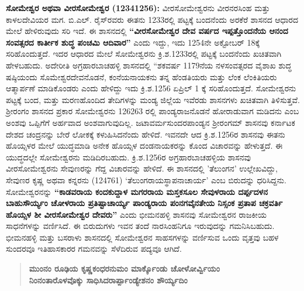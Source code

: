 \textbf{ಸೋಮೇಶ್ವರ ಅಥವಾ ವೀರಸೋಮೇಶ್ವರ (1234\general{\enginline{-}}1256):} ವೀರಸೋಮೇಶ್ವರನು ವೀರನರಸಿಂಹ ಮತ್ತು ಕಾಳಲದೇವಿಯರ ಮಗ. ಬಿ.ಎಲ್​. ರೈಸ್​ರವರು ಈತನು 1233ರಲ್ಲಿ ಪಟ್ಟಕ್ಕೆ ಬಂದನೆಂದು ಅರಕೆರೆ ಶಾಸನದ ಆಧಾರದ ಮೇಲೆ ಹೇಳಿರುವುದು ಸರಿ ಇದೆ. ಈ ಶಾಸನದಲ್ಲಿ \textbf{“ವೀರಸೋಮೇಶ್ವರ ದೇವ ವರ್ಷದ ಇಪ್ಪತ್ತೊಂದನೆಯ ಆನಂದ ಸಂವತ್ಸರದ ಕಾರ್ತೀಕ ಶುದ್ಧ ಪಂಚಮಿ ಆದಿವಾರ”} ಎಂದು ಇದ್ದು, ಇದು 1254ನೇ ಅಕ್ಟೋಬರ್​ 18ಕ್ಕೆ ಸರಿಹೊಂದುತ್ತದೆ. ಇದರ ಆಧಾರದ ಮೇಲೆ ಸೋಮೇಶ್ವರನು ಕ್ರಿ.ಶ.1233ರಲ್ಲಿ ಪಟ್ಟಕ್ಕೆ ಬಂದನೆಂದು ಖಚಿತವಾಗಿ ಹೇಳಬಹುದು. ಅದೇರೀತಿ ಅಗ್ರಹಾರಬಾಚಹಳ್ಳಿ ಶಾಸನದಲ್ಲಿ “ಶಕವರ್ಷ 1179ನೆಯ ನಳಸಂವತ್ಸರದ ವೈಶಾಖ ಶುದ್ಧ ಷಷ್ಠಿಯಂದು ಸೊಮೇಶ್ವರದೇವನೊಡನೆ, ಕಂನೆಯ\-ನಾಯಕನು ತನ್ನ ಹೆಂಡತಿಯರು ಮತ್ತು ಲೆಂಕ ಲೆಂಕಿತಿಯರು ಆತ್ಮಾರ್ಪಣೆ ಮಾಡಿಕೊಂಡರು ಎಂದು ಹೇಳಿದ್ದು ಇದು ಕ್ರಿ.ಶ.1256 ಏಪ್ರಿಲ್​ 1 ಕ್ಕೆ ಸರಿಹೊಂದುತ್ತದೆ. ಸೋಮೇಶ್ವರನು ಪಟ್ಟಕ್ಕೆ ಬಂದ, ಮತ್ತು ಮರಣಹೊಂದಿದ ತೇದಿಗಳನ್ನು ಮಂಡ್ಯ ಜಿಲ್ಲೆಯ ಇವೆರಡು ಶಾಸನಗಳು ಖಚಿತವಾಗಿ ತಿಳಿಸುತ್ತವೆ. ಶ‍್ರೀರಂಗಂ ಶಾಸನದ ಪ್ರಕಾರ ಸೋಮೇಶ್ವರನು 1262\enginline{-}63 ರಲ್ಲಿ ಪಾಂಡ್ಯರಾಜನೊಡನೆ ಹೋರಾಡುವಾಗ ಮಡಿದನು ಎಂಬ ಅಂಶವು ಒಪ್ಪಿಗೆಗೆ ಅರ್ಹವಾದ ಅಂಶವಾಗುವುದಿಲ್ಲ. ಜಟಾವರ್ಮಸುಂದರಪಾಂಡ್ಯನ ಶ‍್ರೀರಂಗಮ್ ಶಾಸನವು ಕರ್ನಾಟಕ ದೇಶದ ಚಂದ್ರನನ್ನು ಬೇರೆ ಲೋಕಕ್ಕೆ ಕಳುಹಿಸಿದನೆಂದು ಹೇಳಿದೆ. ಇವನದೇ ಆದ ಕ್ರಿ.ಶ.1256ರ ಶಾಸನವು ಈತನು ಹೊಯ್ಸಳರ ಮೇಲೆ ಯುದ್ಧಮಾಡಿ ಅನೇಕ ಹೊಯ್ಸಳ ದಂಡನಾಯಕರನ್ನು ಕೊಂದ ವಿಚಾರವನ್ನು ಹೇಳುತ್ತದೆ. ಈ ಯುದ್ಧದಲ್ಲೇ ಸೋಮೇಶ್ವರನು ಮಡಿದಿರಬಹುದು. ಕ್ರಿ.ಶ.1256ರ ಅಗ್ರಹಾರಬಾಚಹಳ್ಳಿಯ ಶಾಸನವು ವೀರಸೋಮೇಶ್ವರನು ಸೇವುಣರನ್ನು ಗೆದ್ದ ವಿಚಾರವನ್ನು ಹೇಳಿದೆ. ಈ ಶಾಸನದಲ್ಲಿ 'ತೆಲುಂಗನ' ಉಲ್ಲೇಖವಿದ್ದು, ಸೇವುಣರ ಕೃಷ್ಣ ಅಥವಾ ಕನ್ನರನು (1247\enginline{-}61) `ತೆಲುಂಗರಾಯಸ್ಥಾಪನಾಚಾರ್ಯ' ಎಂಬ ಬಿರುದನ್ನು ಧರಿಸಿದ್ದನು. ಸೋಮೇಶ್ವರನನ್ನು \textbf{“ಕಾಡವರಾಯ ಕಂದಕುದ್ದಾಳ ಮಗರರಾಯ ಮಸ್ತಕಸೂಲ ಸೇವುಳರಾಯ ದರ್ಪ್ಪದಳನ ಬಾಹುಸೌರ್ಯ್ಯಂ ಚೋಳರಾಯ ಪ್ರತಿಷ್ಟಾಚಾರ್ಯ್ಯ ಪಾಂಡ್ಯರಾಯ ಪಂನಗವೈನತೇಯ ನಿಸ್ಸಂಕ ಪ್ರತಾಪ ಚಕ್ರವರ್ತಿ ಹೊಯ್ಸಳ ಶೀ ವೀರಸೋಮೇಶ್ವರ ದೇವರು”} ಎಂದು ಭೀಮನಹಳ್ಳಿ ಶಾಸನವು ಸೋಮೇಶ್ವರನ ರಾಜಕೀಯ ಸಾಧನೆಗಳನ್ನು ವರ್ಣಿಸಿದೆ. ಈ ಬಿರುದುಗಳು ಇವನ ತಂದೆ ನಾರಸಿಂಹನಿಗೂ ಇರುವುದನ್ನು ಗಮನಿಸಿಬಹುದು. ಭೀಮನಹಳ್ಳಿ ಮತ್ತು ಬಸರಾಳು ಶಾಸನದಲ್ಲಿ ಸೋಮೇಶ್ವರನ ಸಾಹಸಗಳನ್ನು ವರ್ಣಿಸುವ ಒಂದು ವೃತ್ತವು ಬಹಳ ಸುಂದರವೂ ಇತಿಹಾಸಕಾರರ ಗಮನವನ್ನು ಸೆಳೆದಿರುವ ಪದ್ಯವೂ ಆಗಿದೆ.

\begin{verse}
\textbf{ಮುಂನಂ ರೂಢಿಯ ಕೃಷ್ಣಕಂಧರನುಮಂ ಮಾರ್ಕ್ಕೊಂಡು ಚೋಳೋರ್ವ್ವಿಯಂ} \\
\textbf{ನಿಂನಂತಾರೊಳವೊಕ್ಕು ಸಾಧಿಸಿದರಾರ್ಪ್ಪಾಂಡ್ಯೇಶನಂ ಶೌರ್ಯ್ಯದಿಂ} \\
\end{verse}

